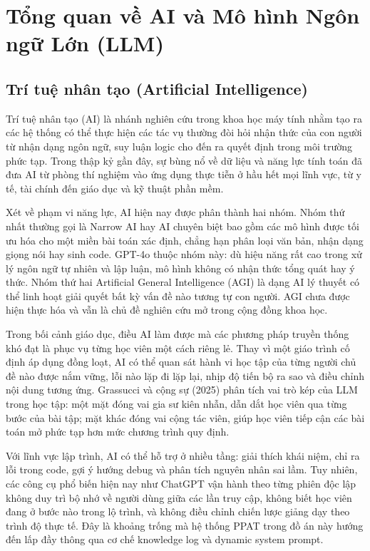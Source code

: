\documentclass[../main.tex]{subfiles}
\begin{document}
\section{Tổng quan về AI và Mô hình Ngôn ngữ Lớn (LLM)}

\subsection{Trí tuệ nhân tạo (Artificial Intelligence)}

Trí tuệ nhân tạo (AI) là nhánh nghiên cứu trong khoa học máy tính nhằm tạo ra các hệ thống có thể thực hiện các tác vụ thường đòi hỏi nhận thức của con người từ nhận dạng ngôn ngữ, suy luận logic cho đến ra quyết định trong môi trường phức tạp. Trong thập kỷ gần đây, sự bùng nổ về dữ liệu và năng lực tính toán đã đưa AI từ phòng thí nghiệm vào ứng dụng thực tiễn ở hầu hết mọi lĩnh vực, từ y tế, tài chính đến giáo dục và kỹ thuật phần mềm.

Xét về phạm vi năng lực, AI hiện nay được phân thành hai nhóm. Nhóm thứ nhất thường gọi là Narrow AI hay AI chuyên biệt bao gồm các mô hình được tối ưu hóa cho một miền bài toán xác định, chẳng hạn phân loại văn bản, nhận dạng giọng nói hay sinh code. GPT-4o thuộc nhóm này: dù hiệu năng rất cao trong xử lý ngôn ngữ tự nhiên và lập luận, mô hình không có nhận thức tổng quát hay ý thức. Nhóm thứ hai Artificial General Intelligence (AGI) là dạng AI lý thuyết có thể linh hoạt giải quyết bất kỳ vấn đề nào tương tự con người. AGI chưa được hiện thực hóa và vẫn là chủ đề nghiên cứu mở trong cộng đồng khoa học.

Trong bối cảnh giáo dục, điều AI làm được mà các phương pháp truyền thống khó đạt là phục vụ từng học viên một cách riêng lẻ. Thay vì một giáo trình cố định áp dụng đồng loạt, AI có thể quan sát hành vi học tập của từng người chủ đề nào được nắm vững, lỗi nào lặp đi lặp lại, nhịp độ tiến bộ ra sao và điều chỉnh nội dung tương ứng. Grassucci và cộng sự (2025) phân tích vai trò kép của LLM trong học tập: một mặt đóng vai gia sư kiên nhẫn, dẫn dắt học viên qua từng bước của bài tập; mặt khác đóng vai cộng tác viên, giúp học viên tiếp cận các bài toán mở phức tạp hơn mức chương trình quy định.

Với lĩnh vực lập trình, AI có thể hỗ trợ ở nhiều tầng: giải thích khái niệm, chỉ ra lỗi trong code, gợi ý hướng debug và phân tích nguyên nhân sai lầm. Tuy nhiên, các công cụ phổ biến hiện nay như ChatGPT vận hành theo từng phiên độc lập không duy trì bộ nhớ về người dùng giữa các lần truy cập, không biết học viên đang ở bước nào trong lộ trình, và không điều chỉnh chiến lược giảng dạy theo trình độ thực tế. Đây là khoảng trống mà hệ thống PPAT trong đồ án này hướng đến lấp đầy thông qua cơ chế knowledge log và dynamic system prompt.
\end{document}
